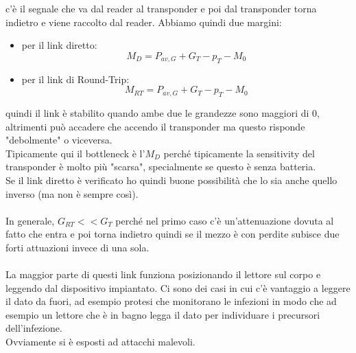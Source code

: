 \documentclass[oneside, 12pt]{extbook}
\begin{document}
c'è il segnale che va dal reader al transponder e poi dal transponder torna indietro e viene raccolto dal reader. Abbiamo quindi due margini:
\begin{itemize}
	\item per il link diretto:
	\begin{equation}
		M_D = P_{av,G} + G_T - p_T - M_0
	\end{equation}
	\item per il link di Round-Trip:
	\begin{equation}
		M_{RT} = P_{av,G} + G_T - p_T - M_0
	\end{equation}
\end{itemize}
quindi il link è stabilito quando ambe due le grandezze sono maggiori di 0, altrimenti può accadere che accendo il transponder ma questo risponde "debolmente" o viceversa.\\Tipicamente qui il bottleneck è l'$M_D$ perché tipicamente la sensitivity del transponder è molto più "scarsa", specialmente se questo è senza batteria.\\Se il link diretto è verificato ho quindi buone possibilità che lo sia anche quello inverso (ma non è sempre così).\\\\In generale, $G_{RT} << G_T$ perché nel primo caso c'è un'attenuazione dovuta al fatto che entra e poi torna indietro quindi se il mezzo è con perdite subisce due forti attuazioni invece di una sola.\\\\La maggior parte di questi link funziona posizionando il lettore sul corpo e leggendo dal dispositivo impiantato. Ci sono dei casi in cui c'è vantaggio a leggere il dato da fuori, ad esempio protesi che monitorano le infezioni in modo che ad esempio un lettore che è in bagno legga il dato per individuare i precursori dell'infezione.\\Ovviamente si è esposti ad attacchi malevoli.
\end{document}

